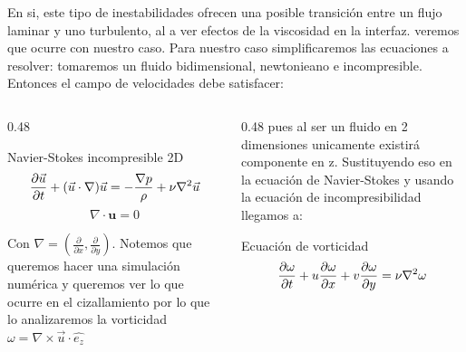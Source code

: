 \documentclass[aspectratio=169, 12pt]{beamer}
\newcommand{\uv}{\mathbf{u}}
\begin{document}
\begin{frame}
  En si, este tipo de inestabilidades ofrecen una posible transición entre un flujo laminar y uno turbulento, al a ver efectos de la viscosidad en la interfaz. veremos que ocurre con nuestro caso. Para nuestro caso simplificaremos las ecuaciones a resolver: tomaremos un fluido bidimensional, newtonieano e incompresible. Entonces el campo de velocidades debe satisfacer:

  \vspace{0.3em}
  \begin{columns}
    \begin{column}{0.48\textwidth}
      \begin{block}{Navier-Stokes incompresible 2D}
        \[
          \pdv{\vec{u}}{t} + (\vec{u}\cdot\nabla)\vec{u} =
          -\frac{\nabla p}{\rho} + \nu\nabla^2\vec{u}
        \]
        \[
          \nabla\cdot\uv = 0
        \]
      \end{block}

      \vspace{0.5em}
      Con $\nabla = (\frac{\partial}{\partial x},\frac{\partial}{\partial y} )$. Notemos que queremos hacer una simulación numérica y queremos ver lo que ocurre en el cizallamiento por lo que lo analizaremos la vorticidad $\omega = \nabla \times \vec{u} \cdot \hat{e_z}$
    \end{column}
    \begin{column}{0.48\textwidth}
       pues al ser un fluido en 2 dimensiones unicamente existirá componente en z. Sustituyendo eso en la ecuación de Navier-Stokes y usando la ecuación de incompresibilidad llegamos a:
       \begin{alertblock}{Ecuación de vorticidad}
        \[
          \pdv{\omega}{t} + u\pdv{\omega}{x} + v\pdv{\omega}{y}
          = \nu\nabla^2\omega
        \]
      \end{alertblock}
    \end{column}
  \end{columns}
\end{frame}
\end{document}
